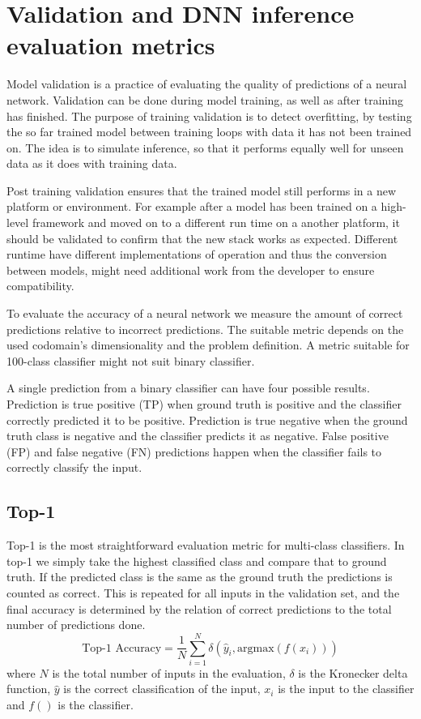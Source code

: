 \documentclass[12pt,a4paper,english
]{tunithesis}
\begin{document}
\section{Validation and DNN inference evaluation metrics}
Model validation is a practice of evaluating the quality of predictions of a neural network. Validation can be done during model training, as well as after training has finished. The purpose of training validation is to detect overfitting, by testing the so far trained model between training loops with data it has not been trained on. The idea is to simulate inference, so that it performs equally well for unseen data as it does with training data.

Post training validation ensures that the trained model still performs in a new platform or environment. For example after a model has been trained on a high-level framework and moved on to a different run time on a another platform, it should be validated to confirm that the new stack works as expected. Different runtime have different implementations of operation and thus the conversion between models, might need additional work from the developer to ensure compatibility.

To evaluate the accuracy of a neural network we measure the amount of correct predictions relative to incorrect predictions. The suitable metric depends on the used codomain's dimensionality and the problem definition. A metric suitable for 100-class classifier might not suit binary classifier.

A single prediction from a binary classifier can have four possible results. Prediction is true positive (TP) when ground truth is positive and the classifier correctly predicted it to be positive. Prediction is true negative when the ground truth class is negative and the classifier predicts it as negative. False positive (FP) and false negative (FN) predictions happen when the classifier fails to correctly classify the input.

\subsection{Top-1}
Top-1 is the most straightforward evaluation metric for multi-class classifiers. In top-1 we simply take the highest classified class and compare that to ground truth. If the predicted class is the same as the ground truth the predictions is counted as correct. This is repeated for all inputs in the validation set, and the final accuracy is determined by the relation of correct predictions to the total number of predictions done.
\begin{equation}
\text{Top-1 Accuracy} = \frac{1}{N} \sum_{i=1}^{N} \delta(\hat{y}_i, \text{argmax}(f(x_i)))
\end{equation}
where $N$ is the total number of inputs in the evaluation, $\delta$ is the Kronecker delta function, $\hat{y}$ is the correct classification of the input, $x_i$ is the input to the classifier and $f()$ is the classifier.
\end{document}
